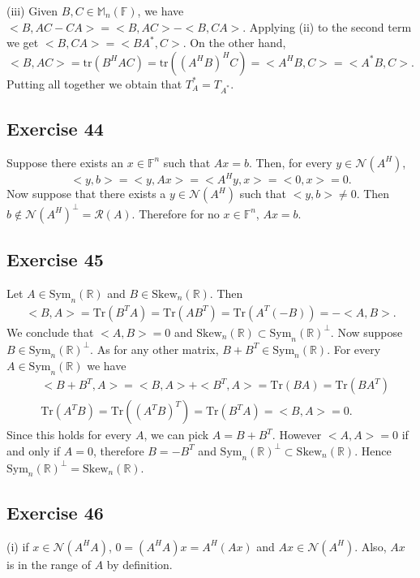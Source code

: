 \documentclass[11.5pt, letterpaper, bibtotoc,
    tablecaptionabove, figurecaptionabove]{article}
\begin{document}
(iii)
Given $B,C\in\mathbb M_n(\mathbb F)$, we have $<B,AC-CA>=<B,AC>-<B,CA>$. 
Applying (ii) to the second term we get $<B,CA>=<BA^*,C>$.
On the other hand, 
\begin{equation*}
    <B,AC>=\text{tr}(B^HAC)=\text{tr}((A^HB)^HC)=<A^HB,C>=<A^*B,C>.
\end{equation*}
Putting all together we obtain that $T_A^*=T_{A^*}$.

\subsection*{Exercise 44}
Suppose there exists an $x\in\mathbb F^n$ such that $Ax=b$.
Then, for every $y\in\mathcal N(A^H)$, 
$$<y,b>=<y,Ax>=<A^Hy,x>=<0,x>=0.$$
Now suppose that there exists a $y\in\mathcal N(A^H)$ such that $<y,b>\neq0$.
Then $b\notin\mathcal N(A^H)^\perp=\mathcal R(A)$.
Therefore for no $x\in\mathbb F^n$, $Ax=b$.

\subsection*{Exercise 45}
Let $A\in\text{Sym}_n(\mathbb R)$ and $B\in\text{Skew}_n(\mathbb R)$.
Then 
\begin{align*}
    <B,A>=\text{Tr}(B^TA)=\text{Tr}(AB^T)=
    \text{Tr}(A^T(-B))=-<A,B>.
\end{align*}
We conclude that $<A,B>=0$ and $\text{Skew}_n(\mathbb R)\subset\text{Sym}_n(\mathbb R)^\perp$.
Now suppose $B\in\text{Sym}_n(\mathbb R)^\perp$.
As for any other matrix, $B+B^T\in\text{Sym}_n(\mathbb R)$.
For every $A\in\text{Sym}_n(\mathbb R)$ we have
\begin{align*}
    &<B+B^T, A> = <B,A> + <B^T,A> = \text{Tr}(BA) = \text{Tr}(BA^T)\\
    &\text{Tr}(A^TB) = \text{Tr}((A^TB)^T) = \text{Tr}(B^TA) = <B,A> = 0.
\end{align*}
Since this holds for every $A$, we can pick $A=B+B^T$.
However $<A,A>=0$ if and only if $A=0$, therefore $B=-B^T$ and 
$\text{Sym}_n(\mathbb R)^\perp\subset\text{Skew}_n(\mathbb R)$.
Hence $\text{Sym}_n(\mathbb R)^\perp=\text{Skew}_n(\mathbb R)$.

\subsection*{Exercise 46}
(i)
if $x\in\mathcal N(A^HA)$, $0=(A^HA)x=A^H(Ax)$ and $Ax\in\mathcal N(A^H)$.
Also, $Ax$ is in the range of $A$ by definition.
\end{document}

